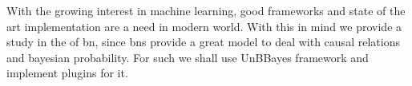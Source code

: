  With the growing interest in machine learning, good frameworks and state of the art implementation are a need in modern world. With this in mind we provide a study in the of \gls{bn}, since \glspl{bn} provide a great model to deal with causal relations and bayesian probability. For such we shall use UnBBayes framework and implement plugins for it.
  